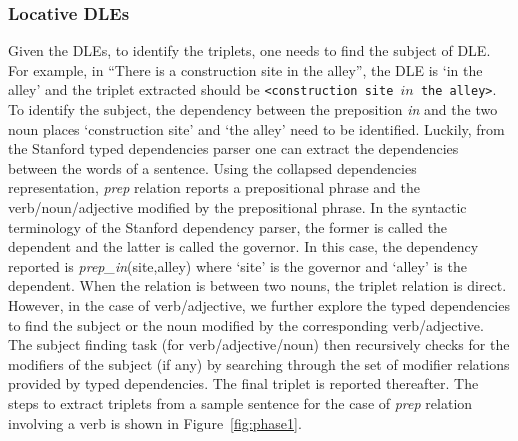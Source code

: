 \documentclass{sig-alternate}
\begin{document}
\subsubsection*{Locative DLEs}
Given the DLEs, to identify the triplets, one needs to find the subject of DLE. For example, in ``There is a construction site in the alley'', the DLE is `in the alley' and the triplet extracted should be \texttt{<construction site $in$ the alley>}. To  identify the subject, the dependency between the preposition \textit{in} and the two noun places `construction site' and `the alley' need to be identified. Luckily, from the Stanford typed dependencies parser \cite{marneffe:stanford} one can extract the dependencies between the words of a sentence. Using the collapsed dependencies representation, \textit{prep} relation reports a prepositional phrase and the verb/noun/adjective modified by the prepositional phrase. In the syntactic terminology of the Stanford dependency parser, the former is called the dependent and the latter is called the governor. In this case, the dependency reported is \textit{prep\_in}(site,alley) where `site' is the governor and `alley' is the dependent. When the relation is between two nouns, the triplet relation is direct.
However, in the case of verb/adjective, we further explore the typed dependencies to find the subject or the noun modified by the corresponding verb/adjective. The subject finding task (for verb/adjective/noun) then recursively checks for the modifiers of the subject (if any) by searching through the set of modifier relations provided by typed dependencies. The final triplet is reported thereafter. The steps to extract triplets from a sample sentence for the case of \textit{prep} relation involving a verb is shown in Figure~\ref{fig:phase1}.
\end{document}
